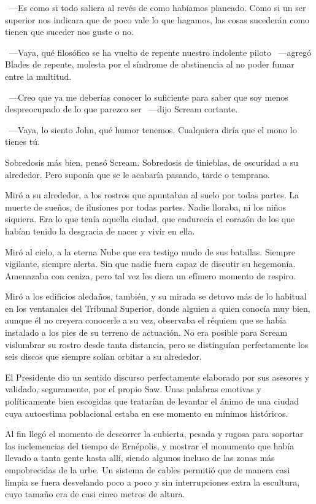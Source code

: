 ~---Es como si todo saliera al revés de como habíamos planeado. Como si un ser superior nos indicara que de poco vale lo que hagamos, las cosas sucederán como tienen que suceder nos guste o no.

~---Vaya, qué filosófico se ha vuelto de repente nuestro indolente piloto ~---agregó Blades de repente, molesta por el síndrome de abstinencia al no poder fumar entre la multitud.

~---Creo que ya me deberías conocer lo suficiente para saber que soy menos despreocupado de lo que parezco ser ~---dijo Scream cortante.

~---Vaya, lo siento John, qué humor tenemos. Cualquiera diría que el mono lo tienes tú.

Sobredosis más bien, pensó Scream. Sobredosis de tinieblas, de oscuridad a su alrededor. Pero suponía que se le acabaría pasando, tarde o temprano.

Miró a su alrededor, a los rostros que apuntaban al suelo por todas partes. La muerte de sueños, de ilusiones por todas partes. Nadie lloraba, ni los niños siquiera. Era lo que tenía aquella ciudad, que endurecía el corazón de los que habían tenido la desgracia de nacer y vivir en ella.

Miró al cielo, a la eterna Nube que era testigo mudo de sus batallas. Siempre vigilante, siempre alerta. Sin que nadie fuera capaz de discutir su hegemonía. Amenazaba con ceniza, pero tal vez les diera un efímero momento de respiro.

Miró a los edificios aledaños, también, y su mirada se detuvo más de lo habitual en los ventanales del Tribunal Superior, donde alguien a quien conocía muy bien, aunque él no creyera conocerle a su vez, observaba el réquiem que se había instalado a los pies de su terreno de actuación. No era posible para Scream vislumbrar su rostro desde tanta distancia, pero se distinguían perfectamente los seis discos que siempre solían orbitar a su alrededor.

El Presidente dio un sentido discurso perfectamente elaborado por sus asesores y validado, seguramente, por el propio Saw. Unas palabras emotivas y políticamente bien escogidas que tratarían de levantar el ánimo de una ciudad cuya autoestima poblacional estaba en ese momento en mínimos históricos.

Al fin llegó el momento de descorrer la cubierta, pesada y rugosa para soportar las inclemencias del tiempo de Ernépolis, y mostrar el monumento que había llevado a tanta gente hasta allí, siendo algunos incluso de las zonas más empobrecidas de la urbe. Un sistema de cables permitió que de manera casi limpia se fuera desvelando poco a poco y sin interrupciones extra la escultura, cuyo tamaño era de casi cinco metros de altura.


